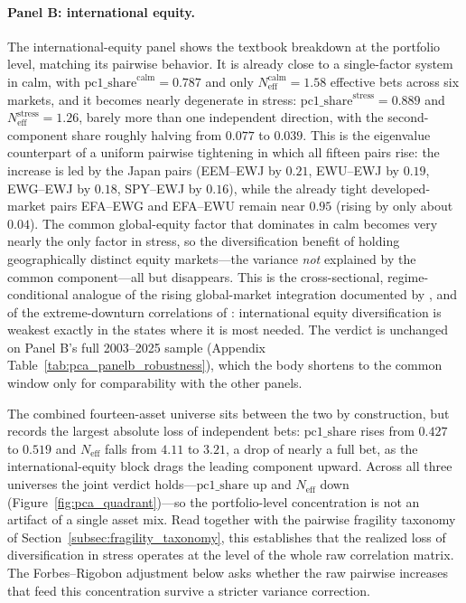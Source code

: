 \paragraph{Panel B: international equity.} The international-equity panel shows the textbook breakdown at the portfolio level, matching its pairwise behavior. It is already close to a single-factor system in calm, with $\mathrm{pc1\_share}^{\mathrm{calm}} = 0.787$ and only $N_{\mathrm{eff}}^{\mathrm{calm}} = 1.58$ effective bets across six markets, and it becomes nearly degenerate in stress: $\mathrm{pc1\_share}^{\mathrm{stress}} = 0.889$ and $N_{\mathrm{eff}}^{\mathrm{stress}} = 1.26$, barely more than one independent direction, with the second-component share roughly halving from $0.077$ to $0.039$. This is the eigenvalue counterpart of a uniform pairwise tightening in which all fifteen pairs rise: the increase is led by the Japan pairs (EEM--EWJ by $0.21$, EWU--EWJ by $0.19$, EWG--EWJ by $0.18$, SPY--EWJ by $0.16$), while the already tight developed-market pairs EFA--EWG and EFA--EWU remain near $0.95$ (rising by only about $0.04$). The common global-equity factor that dominates in calm becomes very nearly the only factor in stress, so the diversification benefit of holding geographically distinct equity markets---the variance \emph{not} explained by the common component---all but disappears. This is the cross-sectional, regime-conditional analogue of the rising global-market integration documented by \citet{pukthuanthong2009global}, and of the extreme-downturn correlations of \citet{longin2001extreme}: international equity diversification is weakest exactly in the states where it is most needed. The verdict is unchanged on Panel B's full 2003--2025 sample (Appendix Table~\ref{tab:pca_panelb_robustness}), which the body shortens to the common window only for comparability with the other panels.

The combined fourteen-asset universe sits between the two by construction, but records the largest absolute loss of independent bets: $\mathrm{pc1\_share}$ rises from $0.427$ to $0.519$ and $N_{\mathrm{eff}}$ falls from $4.11$ to $3.21$, a drop of nearly a full bet, as the international-equity block drags the leading component upward. Across all three universes the joint verdict holds---$\mathrm{pc1\_share}$ up and $N_{\mathrm{eff}}$ down (Figure~\ref{fig:pca_quadrant})---so the portfolio-level concentration is not an artifact of a single asset mix. Read together with the pairwise fragility taxonomy of Section~\ref{subsec:fragility_taxonomy}, this establishes that the realized loss of diversification in stress operates at the level of the whole raw correlation matrix. The Forbes--Rigobon adjustment below asks whether the raw pairwise increases that feed this concentration survive a stricter variance correction.

